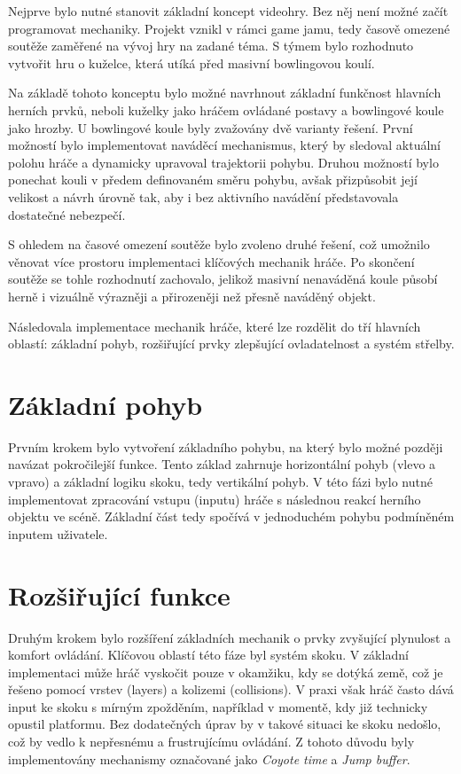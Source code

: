 Nejprve bylo nutné stanovit základní koncept videohry. Bez něj není možné začít programovat mechaniky. Projekt vznikl v rámci game jamu, tedy časově omezené soutěže zaměřené na vývoj hry na zadané téma. S týmem bylo rozhodnuto vytvořit hru o kuželce, která utíká před masivní bowlingovou koulí.

Na základě tohoto konceptu bylo možné navrhnout základní funkčnost hlavních herních prvků, neboli kuželky jako hráčem ovládané postavy a bowlingové koule jako hrozby. U bowlingové koule byly zvažovány dvě varianty řešení. První možností bylo implementovat naváděcí mechanismus, který by sledoval aktuální polohu hráče a dynamicky upravoval trajektorii pohybu. Druhou možností bylo ponechat kouli v předem definovaném směru pohybu, avšak přizpůsobit její velikost a návrh úrovně tak, aby i bez aktivního navádění představovala dostatečné nebezpečí.

S ohledem na časové omezení soutěže bylo zvoleno druhé řešení, což umožnilo věnovat více prostoru implementaci klíčových mechanik hráče. Po skončení soutěže se tohle rozhodnutí zachovalo, jelikož masivní nenaváděná koule působí herně i vizuálně výrazněji a přirozeněji než přesně naváděný objekt.

Následovala implementace mechanik hráče, které lze rozdělit do tří hlavních oblastí: základní pohyb, rozšiřující prvky zlepšující ovladatelnost a systém střelby.

\section{Základní pohyb}

Prvním krokem bylo vytvoření základního pohybu, na který bylo možné později navázat pokročilejší funkce. Tento základ zahrnuje horizontální pohyb (vlevo a vpravo) a základní logiku skoku, tedy vertikální pohyb. V této fázi bylo nutné implementovat zpracování vstupu (inputu) hráče s následnou reakcí herního objektu ve scéně. Základní část tedy spočívá v jednoduchém pohybu podmíněném inputem uživatele.

\section{Rozšiřující funkce}

Druhým krokem bylo rozšíření základních mechanik o prvky zvyšující plynulost a komfort ovládání. Klíčovou oblastí této fáze byl systém skoku. V základní implementaci může hráč vyskočit pouze v okamžiku, kdy se dotýká země, což je řešeno pomocí vrstev (layers) a kolizemi (collisions). V praxi však hráč často dává input ke skoku s mírným zpožděním, například v momentě, kdy již technicky opustil platformu. Bez dodatečných úprav by v takové situaci ke skoku nedošlo, což by vedlo k nepřesnému a frustrujícímu ovládání. Z tohoto důvodu byly implementovány mechanismy označované jako \textit{Coyote time} a \textit{Jump buffer}.

